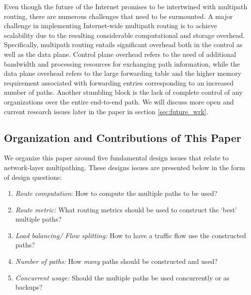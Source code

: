 \documentclass[10pt]{IEEEtran}
\begin{document}
Even though the future of the Internet promises to be intertwined with multipath routing, there are numerous challenges that need to be surmounted. A major challenge in implementing Internet-wide multipath routing is to achieve scalability due to the resulting considerable computational and storage overhead. Specifically, multipath routing entails significant overhead both in the control as well as the data plane. Control plane overhead refers to the need of additional bandwidth and processing resources for exchanging path information, while the data plane overhead refers to the large forwarding table and the higher memory requirement associated with forwarding entries corresponding to an increased number of paths. Another stumbling block is the lack of complete control of any organizations over the entire end-to-end path. We will discuss more open and current research issues later in the paper in section \ref{sec:future_wrk}.

\subsection{Organization and Contributions of This Paper}

We organize this paper around five fundamental design issues that relate to network-layer multipathing. These designs issues are presented below in the form of design questions:

\begin{enumerate}[label=\textbf{Q\arabic*}.,leftmargin=*]

\item \textit{Route computation}: How to compute the multiple paths to be used?

\item \textit{Route metric:} What routing metrics should be used to construct the `best' multiple paths?

\item \textit{Load balancing/ Flow splitting:} How to have a traffic flow use the constructed paths?

\item \textit{Number of paths:} How \textit{many} paths should be constructed and used?

\item \textit{Concurrent usage:} Should the multiple paths be used concurrently or as backups?

\end{enumerate}
\end{document}
